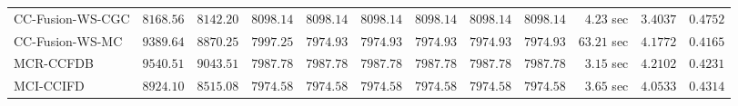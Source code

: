 \begin{table}[H]
\begin{tabular}{lrrrrrrrrrrr}
    CC-Fusion-WS-CGC & $      8168.56$ & $      8142.20$ & $      8098.14$ & $      8098.14$ & $      8098.14$ & $      8098.14$ & $      8098.14$ & $      8098.14$ & $         4.23$ sec    & $       3.4037$  & $       0.4752$ \\ 
     CC-Fusion-WS-MC & $      9389.64$ & $      8870.25$ & $      7997.25$ & $      7974.93$ & $      7974.93$ & $      7974.93$ & $      7974.93$ & $      7974.93$ & $        63.21$ sec    & $       4.1772$  & $       0.4165$ \\ 
\cmidrule{1-1} 
           MCR-CCFDB & $      9540.51$ & $      9043.51$ & $      7987.78$ & $      7987.78$ & $      7987.78$ & $      7987.78$ & $      7987.78$ & $      7987.78$ & $         3.15$ sec    & $       4.2102$  & $       0.4231$ \\ 
\cmidrule{1-1} 
           MCI-CCIFD & $      8924.10$ & $      8515.08$ & $      7974.58$ & $      7974.58$ & $      7974.58$ & $      7974.58$ & $      7974.58$ & $      7974.58$ & $         3.65$ sec    & $       4.0533$  & $       0.4314$ \\ 
\bottomrule
\end{tabular}
\end{table}

